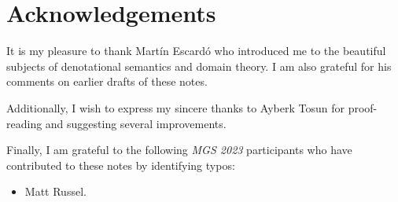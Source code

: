 \chapter{Acknowledgements}

It is my pleasure to thank Mart\'in Escard\'o who introduced me to the beautiful
subjects of denotational semantics and domain theory. I am also grateful for his
comments on earlier drafts of these notes.

Additionally, I wish to express my sincere thanks to Ayberk Tosun for
proof-reading and suggesting several improvements.

Finally, I am grateful to the following \emph{MGS 2023} participants who have
contributed to these notes by identifying typos:

\begin{itemize}
\item Matt Russel.
\end{itemize}


